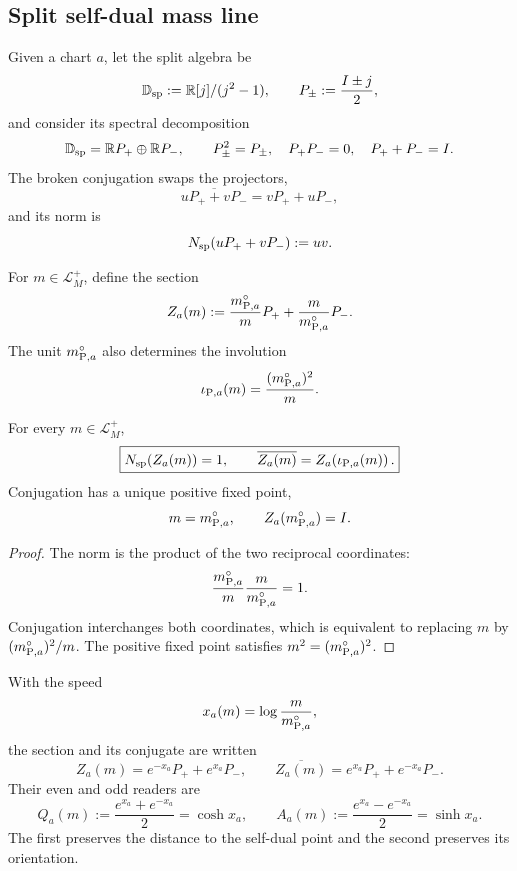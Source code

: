 \subsection{Split self-dual mass line}

Given a chart \(a\), let the split algebra be
\[
 \mathbb D_{\rm sp}:=\mathbb R[j]/(j^2-1),
 \qquad
 P_\pm:=\frac{I\pm j}{2},
\]
and consider its spectral decomposition
\[
 \mathbb D_{\rm sp}
 =\mathbb R P_+\oplus\mathbb R P_-,
 \qquad
 P_\pm^2=P_\pm,\quad
 P_+P_-=0,\quad
 P_++P_-=I.
\]
The broken conjugation swaps the projectors,
\[
 \overline{uP_++vP_-}=vP_++uP_-,
\]
and its norm is
\[
 N_{\rm sp}(uP_++vP_-):=uv.
\]

For \(m\in\mathcal L_M^+\), define the section
\begin{equation}
 Z_a(m)
 :=\frac{m_{{\rm P},a}^{\circ}}{m}P_+
   +\frac{m}{m_{{\rm P},a}^{\circ}}P_- .
 \label{mdg:eq:planck-ct108-seccion-partida-masa-rev3}
\end{equation}
The unit \(m_{{\rm P},a}^{\circ}\) also determines the involution
\begin{equation}
 \iota_{{\rm P},a}(m)
 =\frac{(m_{{\rm P},a}^{\circ})^2}{m}.
 \label{mdg:eq:planck-ct108-involucion-masas-rev3}
\end{equation}

\begin{theorem}
\label{mdg:thm:planck-ct108-recta-partida-masa-rev3}
For every \(m\in\mathcal L_M^+\),
\begin{equation}
 \boxed{
 N_{\rm sp}(Z_a(m))=1,
 \qquad
 \overline{Z_a(m)}
 =Z_a\!\left(\iota_{{\rm P},a}(m)\right).}
 \label{mdg:eq:planck-ct108-norma-conjugacion-rev3}
\end{equation}
Conjugation has a unique positive fixed point,
\[
 m=m_{{\rm P},a}^{\circ},
 \qquad
 Z_a(m_{{\rm P},a}^{\circ})=I.
\]
\end{theorem}

\begin{proof}
The norm is the product of the two reciprocal coordinates:
\[
 \frac{m_{{\rm P},a}^{\circ}}m
 \frac m{m_{{\rm P},a}^{\circ}}=1.
\]
Conjugation interchanges both coordinates, which is equivalent to replacing
\(m\) by \((m_{{\rm P},a}^{\circ})^2/m\). The positive fixed point satisfies
\(m^2=(m_{{\rm P},a}^{\circ})^2\).
\end{proof}

With the speed
\begin{equation}
 x_a(m)=\log\frac{m}{m_{{\rm P},a}^{\circ}},
 \label{mdg:eq:planck-ct108-rapidez-masa-rev3}
\end{equation}
the section and its conjugate are written
\[
 Z_a(m)=e^{-x_a}P_++e^{x_a}P_-,
 \qquad
 \overline{Z_a(m)}
 =e^{x_a}P_++e^{-x_a}P_-.
\]
Their even and odd readers are
\begin{equation}
 Q_a(m):=\frac{e^{x_a}+e^{-x_a}}2=\cosh x_a,
 \qquad
 A_a(m):=\frac{e^{x_a}-e^{-x_a}}2=\sinh x_a.
 \label{mdg:eq:planck-ct108-lectores-par-impar-rev3}
\end{equation}
The first preserves the distance to the self-dual point and the second preserves its orientation.

